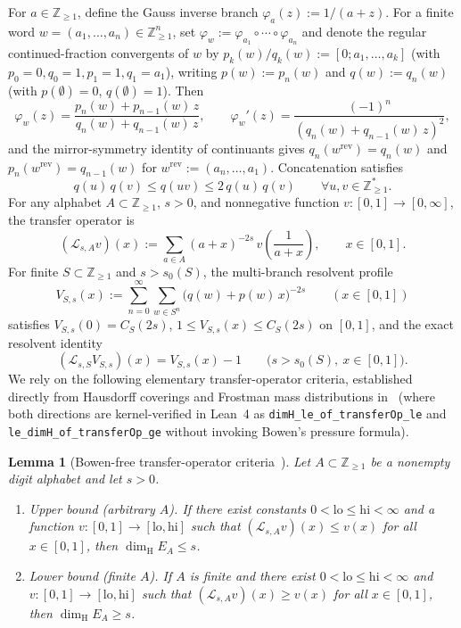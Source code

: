 \documentclass[11pt]{article}
\newtheorem{lemma}[theorem]{Lemma}
\theoremstyle{definition}
\theoremstyle{remark}
\newcommand{\Z}{\mathbb{Z}}
\newcommand{\dimH}{\dim_{\mathrm{H}}}
\begin{document}
For $a\in\Z_{\ge1}$, define the Gauss inverse branch $\varphi_a(z):=1/(a+z)$.
For a finite word $w=(a_1,\dots,a_n)\in\Z_{\ge1}^n$, set
$\varphi_w:=\varphi_{a_1}\circ\cdots\circ\varphi_{a_n}$ and denote the
regular continued-fraction convergents of $w$ by $p_k(w)/q_k(w):=[0;a_1,\dots,a_k]$
(with $p_0=0,q_0=1,p_1=1,q_1=a_1$), writing $p(w):=p_n(w)$ and $q(w):=q_n(w)$
(with $p(\emptyset)=0$, $q(\emptyset)=1$). Then
\begin{equation}\label{eq:mobius-word}
\varphi_w(z)=\frac{p_n(w)+p_{n-1}(w)\,z}{q_n(w)+q_{n-1}(w)\,z},
\qquad
\varphi_w'(z)=\frac{(-1)^n}{(q_n(w)+q_{n-1}(w)\,z)^2},
\end{equation}
and the mirror-symmetry identity of continuants gives
$q_n(w^{\mathrm{rev}})=q_n(w)$ and $p_n(w^{\mathrm{rev}})=q_{n-1}(w)$ for
$w^{\mathrm{rev}}:=(a_n,\dots,a_1)$. Concatenation satisfies
\begin{equation}\label{eq:continuant-mult}
q(u)\,q(v)\le q(uv)\le 2\,q(u)\,q(v)\qquad\forall u,v\in\Z_{\ge1}^*.
\end{equation}
For any alphabet $A\subset\Z_{\ge1}$, $s>0$, and nonnegative function
$v:[0,1]\to[0,\infty]$, the transfer operator is
\[
(\mathcal L_{s,A}v)(x):=\sum_{a\in A}(a+x)^{-2s}\,v\!\left(\frac{1}{a+x}\right),
\qquad x\in[0,1].
\]
For finite $S\subset\Z_{\ge1}$ and $s>s_0(S)$, the multi-branch resolvent
profile
\[
V_{S,s}(x):=\sum_{n=0}^\infty\sum_{w\in S^n}\bigl(q(w)+p(w)\,x\bigr)^{-2s}
\qquad(x\in[0,1])
\]
satisfies $V_{S,s}(0)=C_S(2s)$, $1\le V_{S,s}(x)\le C_S(2s)$ on $[0,1]$, and
the exact resolvent identity
\begin{equation}\label{eq:multi-resolvent}
(\mathcal L_{s,S}V_{S,s})(x)=V_{S,s}(x)-1\qquad\bigl(s>s_0(S),\ x\in[0,1]\bigr).
\end{equation}
We rely on the following elementary transfer-operator criteria, established
directly from Hausdorff coverings and Frostman mass distributions
in~\cite{Paper2} (where both directions are kernel-verified in Lean~4 as
\texttt{dimH\_le\_of\_transferOp\_le} and
\texttt{le\_dimH\_of\_transferOp\_ge} without invoking Bowen's pressure
formula).

\begin{lemma}[Bowen-free transfer-operator criteria~{\cite{Paper2}}]\label{lem:to-criteria}
Let $A\subset\Z_{\ge1}$ be a nonempty digit alphabet and let $s>0$.
\begin{enumerate}[label=\textup{(\roman*)},leftmargin=2.2em]
\item \emph{Upper bound (arbitrary $A$).} If there exist constants
$0<\mathrm{lo}\le\mathrm{hi}<\infty$ and a function
$v:[0,1]\to[\mathrm{lo},\mathrm{hi}]$ such that
$(\mathcal L_{s,A}v)(x)\le v(x)$ for all $x\in[0,1]$, then $\dimH E_A\le s$.
\item \emph{Lower bound (finite $A$).} If $A$ is finite and there exist
$0<\mathrm{lo}\le\mathrm{hi}<\infty$ and $v:[0,1]\to[\mathrm{lo},\mathrm{hi}]$
such that $(\mathcal L_{s,A}v)(x)\ge v(x)$ for all $x\in[0,1]$, then
$\dimH E_A\ge s$.
\end{enumerate}
\end{lemma}
\end{document}
